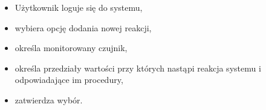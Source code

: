 \documentclass[a4paper,12pt]{article}
\begin{document}
\begin{itemize}
	\item Użytkownik loguje się do systemu,

	\item wybiera opcję dodania nowej reakcji,

	\item określa monitorowany czujnik,

	\item określa przedziały wartości przy których nastąpi reakcja systemu i odpowiadające im procedury,

	\item zatwierdza wybór.
\end{itemize}

\end{document}
